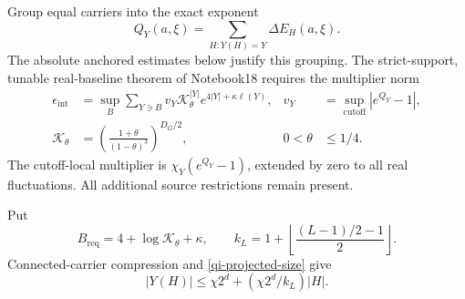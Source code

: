 Group equal carriers into the exact exponent
\begin{equation}\label{qi-grouped-exponent}
 Q_Y(a,\xi)=\sum_{H:Y(H)=Y}\Delta E_H(a,\xi).
\end{equation}
The absolute anchored estimates below justify this grouping.
The strict-support, tunable real-baseline theorem of Notebook18
requires the multiplier norm
\begin{align}
 \epsilon_{\mathrm{int}}
 &=\sup_B\sum_{Y\ni B}v_Y\mathcal K_\theta^{|Y|}
                       e^{4|Y|+\kappa\ell(Y)},
 &v_Y&=\sup_{\mathrm{cutoff}}|e^{Q_Y}-1|,              \label{qi-integration-norm}\\
 \mathcal K_\theta
 &=\left(\frac{1+\theta}{(1-\theta)^3}\right)^{D_G/2},
 &0<\theta&\le1/4.                                    \label{qi-density-cost}
\end{align}
The cutoff-local multiplier is
$\chi_Y(e^{Q_Y}-1)$, extended by zero to all real fluctuations.
All additional source restrictions remain present.

Put
\begin{equation}\label{qi-required-weight}
 B_{\mathrm{req}}=4+\log\mathcal K_\theta+\kappa,
 \qquad
 k_L=1+\left\lfloor\frac{(L-1)/2-1}{2}\right\rfloor.
\end{equation}
Connected-carrier compression and \eqref{qi-projected-size} give
\begin{equation}\label{qi-carrier-compression}
 |Y(H)|\le\chi2^d+(\chi2^d/k_L)|H|.
\end{equation}

